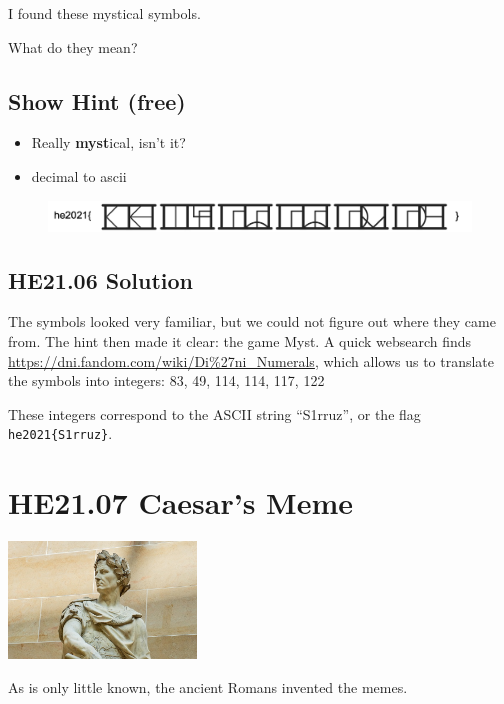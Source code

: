 \documentclass[english,a4paper,nols,noindent]{tufte-handout}
\begin{document}
\noindent I found these mystical symbols.

\noindent What do they mean?

\subsection{Show Hint (free)}
\begin{itemize}
\item Really \textbf{myst}ical, isn't it?
\item decimal to ascii
\end{itemize}

\begin{figure}
    \includegraphics[width=150mm]{ch06/symbols.png}
\end{figure}


\hypertarget{he21.06-solution}{%
\subsection{HE21.06 Solution}\label{he21.06-solution}}

\noindent The symbols looked very familiar, but we could not figure
out where they came from.  The hint then made it clear: the game Myst.
A quick websearch finds
\url{https://dni.fandom.com/wiki/Di\%27ni_Numerals}, which allows us
to translate the symbols into integers: 83, 49, 114, 114, 117, 122

These integers correspond to the ASCII string ``S1rruz'', or the flag \verb+he2021{S1rruz}+.

\hypertarget{he21.07}{%
\section{HE21.07 Caesar's Meme}\label{he21.07}}
\begin{marginfigure}
    \includegraphics[width=50mm]{images/challenge7.jpg}
\end{marginfigure}

\noindent As is only little known, the ancient Romans invented the memes.
\end{document}
